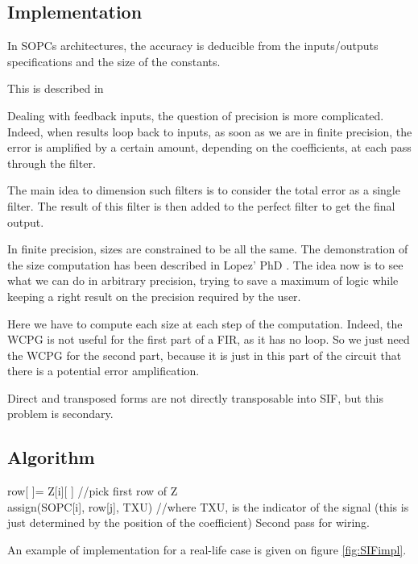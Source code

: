 \subsection{Implementation}

In SOPCs architectures, the accuracy is deducible from the inputs/outputs specifications and the size of the constants.

This is described in %

Dealing with feedback inputs, the question of precision is more complicated.
Indeed, when results loop back to inputs, as soon as we are in finite precision, the error is amplified by a certain amount, depending on the coefficients, at each pass through the filter.

The main idea to dimension such filters is to consider the total error as a single filter.
The result of this filter is then added to the perfect filter to get the final output.

In finite precision, sizes are constrained to be all the same. The demonstration of the size computation has been described in Lopez' PhD \cite{lopez}.
The idea now is to see what we can do in arbitrary precision, trying to save a maximum of logic while keeping a right result on the precision required by the user.

Here we have to compute each size at each step of the computation. Indeed, the WCPG is not useful for the first part of a FIR, as it has no loop.
So we just need the WCPG for the second part, because it is just in this part of the circuit that there is a potential error amplification.

Direct and transposed forms are not directly transposable into SIF, but this problem is secondary.

\subsection{Algorithm}

	\begin{algorithm}[H]
	 {
	 	row[ ]= Z[i][ ] //pick first row of Z \\
	 	 {
	 		assign(SOPC[i], row[j], TXU) //where TXU, is the indicator of the signal (this is just determined by the position of the coefficient)
	 	}
		Second pass for wiring.
	}
	\end{algorithm}

	An example of implementation for a real-life case is given on figure \ref{fig:SIFimpl}.

